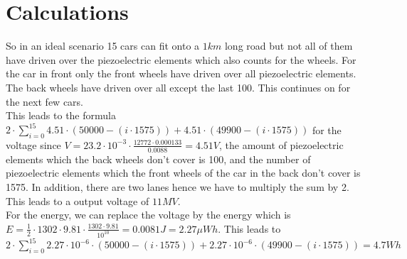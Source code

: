 \section{Calculations}

So in an ideal scenario 15 cars can fit onto a $1km$ long road but not all of them have driven over the piezoelectric elements which also counts for the wheels. For the car in front only the front wheels have driven over all piezoelectric elements. The back wheels have driven over all except the last 100. This continues on for the next few cars.\\
This leads to the formula $2 \cdot \sum_{i=0}^{15} 4.51 \cdot (50000 - (i\cdot 1575)) + 4.51 \cdot (49900 - (i \cdot 1575))$ for the voltage since $V = 23.2 \cdot 10^{-3} \cdot \frac{12772 \cdot 0.000133}{0.0088} = 4.51V$, the amount of piezoelectric elements which the back wheels don't cover is 100, and the number of piezoelectric elements which the front wheels of the car in the back don't cover is 1575. In addition, there are two lanes hence we have to multiply the sum by 2. This leads to a output voltage of $11MV$.\\
For the energy, we can replace the voltage by the energy which is $E = \frac{1}{2} \cdot 1302 \cdot 9.81 \cdot \frac{1302 \cdot 9.81}{10^{10}} = 0.0081J = 2.27 \mu Wh$. This leads to $2 \cdot \sum_{i=0}^{15} 2.27 \cdot 10^{-6} \cdot (50000 - (i\cdot 1575)) + 2.27 \cdot 10^{-6} \cdot (49900 - (i \cdot 1575)) = 4.7Wh$